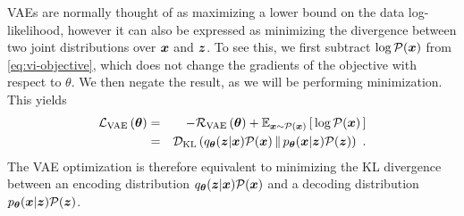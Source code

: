 VAEs are normally thought of as maximizing a lower bound on the data log-likelihood,
however it can also be expressed as minimizing the divergence between two joint
distributions over ${\boldsymbol{x}}$ and ${\boldsymbol z}$.
To see this, we first subtract $\log\mathcal{P}({\boldsymbol{x}})$ from \eqref{eq:vi-objective},
which does not change the gradients of the objective with respect to $\theta$.
We then negate the result, as we will be performing minimization.
This yields
\begin{eqnarray}
\VAEloss \left( \params \right) &=& -\VAEelbo \left( \params \right) +
\E{\x \sim \pjoint (\x)}{ \,  \log \pjoint(\x)  \,}  \nonumber \\
&=& \DKL{ \Menc(\z | \x)\pjoint(\x)}{ \Mdec(\x | \z) \pjoint(\z) } ~.
\label{eq:vae-kl}
\end{eqnarray}
The VAE optimization is therefore equivalent to minimizing the KL divergence
between an encoding distribution $q_{{\boldsymbol \theta}}({\boldsymbol z} | {\boldsymbol{x}})\mathcal{P}({\boldsymbol{x}})$ and a decoding
distribution $p_{{\boldsymbol \theta}}({\boldsymbol{x}} | {\boldsymbol z}) \mathcal{P}({\boldsymbol z})$.